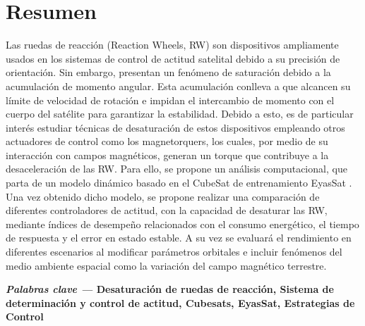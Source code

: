 \pagestyle{fancy}
\section*{Resumen}
%

\noindent 
Las ruedas de reacción (Reaction Wheels, RW) son dispositivos ampliamente usados en los sistemas de control de actitud satelital debido a su precisión de orientación. Sin embargo, presentan un fenómeno de saturación debido a la acumulación de momento angular. Esta acumulación conlleva a que alcancen su límite de velocidad de rotación e impidan el intercambio de momento con el cuerpo del satélite para garantizar la estabilidad. Debido a esto, es de particular interés estudiar técnicas de desaturación de estos dispositivos empleando otros actuadores de control como los magnetorquers, los cuales, por medio de su interacción con campos magnéticos, generan un torque que contribuye a la desaceleración de las RW. Para ello, se propone un análisis computacional, que parta de un modelo dinámico basado en el CubeSat de entrenamiento EyasSat . Una vez obtenido dicho modelo, se propone realizar una comparación de diferentes controladores de actitud, con la capacidad de desaturar las RW, mediante índices de desempeño relacionados con el consumo energético, el tiempo de respuesta y el error en estado estable. A su vez se evaluará el rendimiento en diferentes escenarios al modificar parámetros orbitales e incluir fenómenos del medio ambiente espacial como la variación del campo magnético terrestre.



\vspace{1cm}\textbf{\textit{Palabras clave ---} Desaturación de ruedas de reacción, Sistema de determinación y control de actitud, Cubesats, EyasSat, Estrategias de Control}



